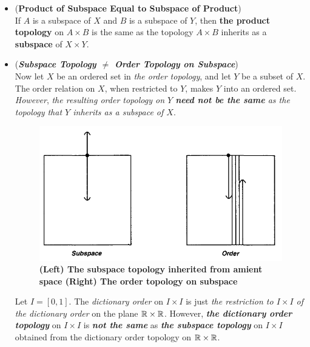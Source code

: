 \documentclass[11pt]{article}
\begin{document}
\begin{itemize}
\item \begin{proposition} (\textbf{Product of Subspace Equal to Subspace of Product}) \citep{munkres2000topology}\\
If $A$ is a subspace of $X$ and $B$ is a subspace of $Y$, then \textbf{the product topology} on $A \times B$ is the same as the topology $A \times B$ inherits as a \textbf{subspace} of $X \times Y$.
\end{proposition}

\item \begin{remark} (\emph{\textbf{Subspace Topology  $\neq$ Order Topology on Subspace}})\\
Now let $X$ be an ordered set in \emph{the order topology}, and let $Y$ be a subset of $X$. The order relation on $X$, when restricted to $Y$, makes $Y$ into an ordered set. \emph{However}, \emph{the resulting order topology on $Y$ \textbf{need not be the same} as the topology that $Y$ inherits as a subspace of $X$}.

\begin{figure}
\begin{minipage}[t]{1\linewidth}
  \centering
  \centerline{\includegraphics[scale = 0.4]{subspace_order_topology.png}}
\end{minipage}
\caption{\footnotesize{\textbf{(Left) The subspace topology inherited from amient space (Right) The order topology on subspace \citep{munkres2000topology}}}}
\label{fig: subspace_order_topology}
\end{figure}

Let $I= [0, 1]$. The \emph{dictionary order} on $I \times I$ is just \emph{the restriction to $I \times I$ of the dictionary order} on the plane ${\mathbb R} \times {\mathbb R}$. However, \emph{\textbf{the dictionary order topology}} on $I \times I$ is \emph{\textbf{not the same}} as \emph{\textbf{the subspace topology}} on $I \times I$ obtained from the dictionary order topology on ${\mathbb R} \times {\mathbb R}$. 


\end{remark}
\end{itemize}
\end{document}
